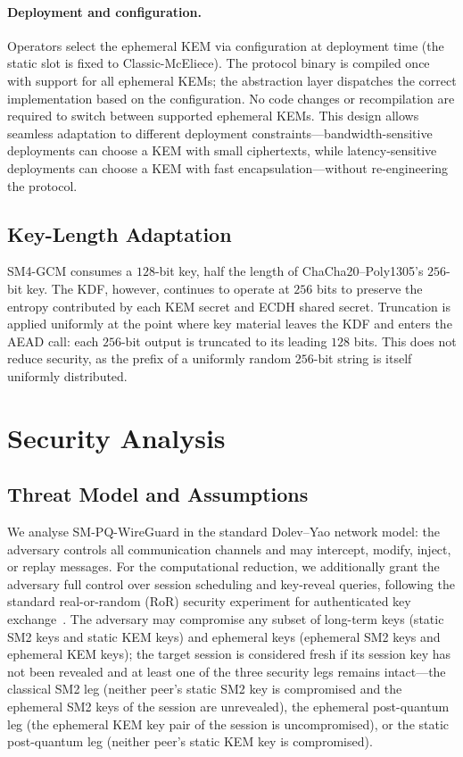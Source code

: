 \documentclass{SCIS2026}
\begin{document}
\paragraph{Deployment and configuration.}
Operators select the ephemeral KEM via configuration at deployment
time (the static slot is fixed to Classic-McEliece).  The protocol
binary is compiled once with support for all ephemeral KEMs; the
abstraction layer dispatches the correct implementation based on the
configuration.  No code changes or recompilation are required to switch
between supported ephemeral KEMs.
This design allows seamless adaptation to different deployment
constraints---bandwidth-sensitive deployments can choose a KEM with
small ciphertexts, while latency-sensitive deployments can choose a
KEM with fast encapsulation---without re-engineering the protocol.

\subsection{Key-Length Adaptation}
\label{sec:keylen}

SM4-GCM consumes a $128$-bit key, half the length of
ChaCha20--Poly1305's $256$-bit key.  The KDF, however, continues to
operate at $256$ bits to preserve the entropy contributed by each
KEM secret and ECDH shared secret.  Truncation is applied uniformly
at the point where key material leaves the KDF and enters the AEAD
call: each $256$-bit output is truncated to its leading $128$ bits.
This does not reduce security, as the prefix of a uniformly random
$256$-bit string is itself uniformly distributed.
\section{Security Analysis}
\label{sec:security}

\subsection{Threat Model and Assumptions}
\label{sec:threat}

We analyse SM-PQ-WireGuard in the standard Dolev--Yao network model:
the adversary controls all communication channels and may intercept,
modify, inject, or replay messages.  For the computational reduction,
we additionally grant the adversary full control over session
scheduling and key-reveal queries, following the standard
real-or-random (RoR) security experiment for authenticated key
exchange~\cite{31,32}.  The adversary may compromise any
subset of long-term keys (static SM2 keys and static KEM keys) and
ephemeral keys (ephemeral SM2 keys and ephemeral KEM keys); the target
session is considered fresh if its session key has not been revealed
and at least one of the three security legs remains intact---the
classical SM2 leg (neither peer's static SM2 key is compromised and the
ephemeral SM2 keys of the session are unrevealed), the ephemeral
post-quantum leg (the ephemeral KEM key pair of the session is
uncompromised), or the static post-quantum leg (neither peer's static
KEM key is compromised).
\end{document}
